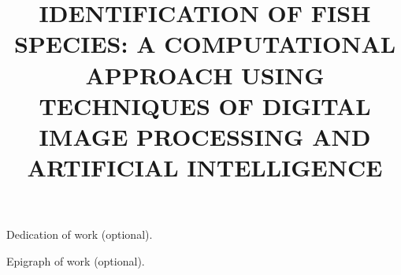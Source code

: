 \documentclass[oneside,english]{normas_posEn-utf-tex} %
\title{\MakeUppercase{IDENTIFICATION OF FISH SPECIES: A computational approach using techniques of digital image processing and artificial intelligence}} %
\begin{document}
\renewcommand{\arraystretch}{1.3}

\capa %
\folhaderosto %

\termodeaprovacao



\begin{dedicatoria}
	Dedication of work (optional).
\end{dedicatoria}

\begin{agradecimentos}
	
\end{agradecimentos}
\begin{epigrafe}
	Epigraph of work (optional).
\end{epigrafe}

\begin{abstract}
	
\end{abstract}

\begin{resumo}
	
\end{resumo}



\listadesiglas %
\sumario %




\setlength{\parskip}{0cm}

%
%

%
%


\end{document}
